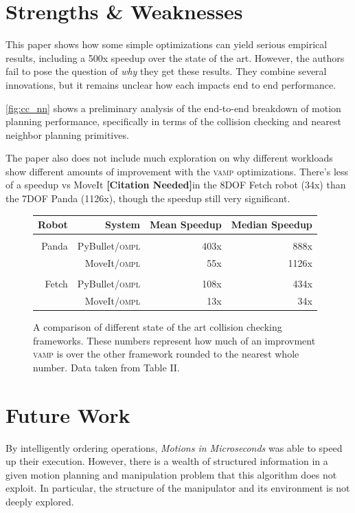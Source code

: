 \documentclass{article}
\newcommand{\citationneeded}{\textbf{\color{blue}[Citation Needed]}}
\begin{document}
\section{Strengths \& Weaknesses}

This paper shows how some simple optimizations can yield serious empirical results, including a 500x speedup over the state of the art. However, the authors fail to pose the question of \textit{why} they get these results. They combine several innovations, but it remains unclear how each impacts end to end performance.

\ref{fig:cc_nn} shows a preliminary analysis of the end-to-end breakdown of motion planning performance, specifically in terms of the collision checking and nearest neighbor planning primitives.

The paper also does not include much exploration on why different workloads show different amounts of improvement with the \textsc{vamp} optimizations. There’s less of a speedup vs MoveIt \citationneeded in the 8DOF Fetch robot (34x) than the 7DOF Panda (1126x), though the speedup still very significant. 


\begin{figure}
\label{fig:data_table}
\begin{tabular}{r|r|r|r|}
Robot & System & Mean Speedup & Median Speedup \\
\hline \\
Panda & PyBullet/\textsc{ompl} & 403x & 888x \\
 & MoveIt/\textsc{ompl} & 55x & 1126x \\
\hline \\
Fetch & PyBullet/\textsc{ompl} & 108x & 434x \\
 & MoveIt/\textsc{ompl} & 13x & 34x \\
\end{tabular}
\caption{A comparison of different state of the art collision checking frameworks. These numbers represent how much of an improvment \textsc{vamp} is over the other framework rounded to the nearest whole number. Data taken from \cite{paper:MiM} Table II.}
\end{figure}

\section{Future Work}

By intelligently ordering operations, \textit{Motions in Microseconds} was able to speed up their execution. However, there is a wealth of structured information in a given motion planning and manipulation problem that this algorithm does not exploit. In particular, the structure of the manipulator and its environment is not deeply explored.
\end{document}
